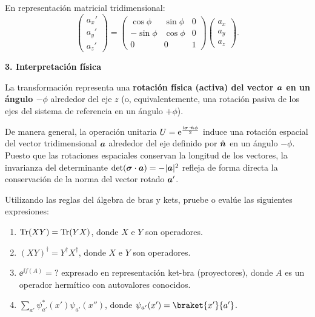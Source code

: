 \begin{resolucion}
En representación matricial tridimensional:
\[
\begin{pmatrix} a_x' \\ a_y' \\ a_z' \end{pmatrix} = \begin{pmatrix} \cos\phi & \sin\phi & 0 \\ -\sin\phi & \cos\phi & 0 \\ 0 & 0 & 1 \end{pmatrix} \begin{pmatrix} a_x \\ a_y \\ a_z \end{pmatrix}.
\]

\textbf{3. Interpretación física}

La transformación representa una \textbf{rotación física (activa) del vector $\bm{a}$ en un ángulo $-\phi$} alrededor del eje $z$ (o, equivalentemente, una rotación pasiva de los ejes del sistema de referencia en un ángulo $+\phi$). 

De manera general, la operación unitaria $U = \mathrm{e}^{\frac{\mathrm{i} \bm{\sigma} \cdot \hat{\bm{n}} \phi}{2}}$ induce una rotación espacial del vector tridimensional $\bm{a}$ alrededor del eje definido por $\hat{\bm{n}}$ en un ángulo $-\phi$. Puesto que las rotaciones espaciales conservan la longitud de los vectores, la invarianza del determinante $\det(\bm{\sigma} \cdot \bm{a}) = -\lvert\bm{a}\rvert^2$ refleja de forma directa la conservación de la norma del vector rotado $\bm{a}'$.
\end{resolucion}

\begin{enunciado}
Utilizando las reglas del álgebra de bras y kets, pruebe o evalúe las siguientes expresiones:
\begin{enumerate}
  \item $\operatorname{Tr}(XY) = \operatorname{Tr}(YX)$, donde $X$ e $Y$ son operadores.
  \item $(XY)^\dagger = Y^\dagger X^\dagger$, donde $X$ e $Y$ son operadores.
  \item $\ee^{\ii f(A)} = ?$ expresado en representación ket-bra (proyectores), donde $A$ es un operador hermítico con autovalores conocidos.
  \item $\sum_{a'} \psi_{a'}^*(x') \psi_{a'}(x'')$, donde $\psi_{a'}(x') = \braket{x'}{a'}$.
\end{enumerate}
\end{enunciado}

